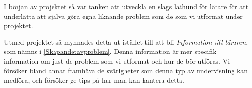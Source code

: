 \textcolor{Mahogany}{I början av projektet så var tanken att utveckla en slags lathund för lärare för att underlätta att själva göra egna liknande problem som de som vi utformat under projektet.}

\textcolor{Mahogany}{Utmed projektet så mynnades detta ut istället till att bli \textsl{Information till läraren}, som nämns i \ref{Skapandetavproblem}. Denna information är mer specifik information om just de problem som vi utformat och hur de bör utföras. Vi försöker bland annat framhäva de svårigheter som denna typ av undervisning kan medföra, och försöker ge tips på hur man kan hantera detta.}